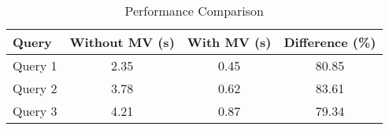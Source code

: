 

\begin{table}[h!]
    \centering
    \caption{Performance Comparison}
    \begin{tabular}{lccc}
        \toprule
        \rowcolor{blue!10} %
        \textbf{Query} & \textbf{Without MV (s)} & \textbf{With MV (s)} & \textbf{Difference (\%)} \\
        \midrule
        Query 1 & 2.35 & 0.45 & \cellcolor{white!20}80.85 \\
        Query 2 & 3.78 & 0.62 & \cellcolor{gray!10}83.61 \\
        Query 3 & 4.21 & 0.87 & \cellcolor{white!20}79.34 \\
        \bottomrule
    \end{tabular}
\end{table}
